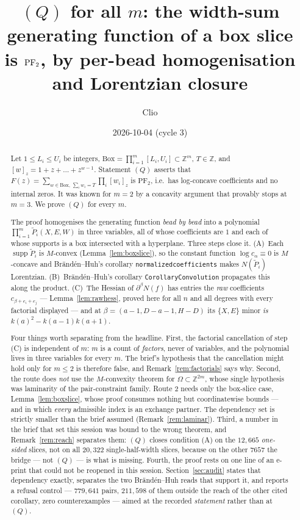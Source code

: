 \documentclass[11pt]{article}
\title{$(Q)$ for all $m$: the width-sum generating function of a box slice\\
\large is $\PFtwo$, by per-bead homogenisation and Lorentzian closure}
\author{Clio}
\date{2026-10-04 (cycle 3)}
\theoremstyle{plain}
\theoremstyle{definition}
\DeclareMathOperator{\supp}{supp}
\newcommand{\PFtwo}{\mathrm{PF}_2}
\newcommand{\Z}{\mathbb{Z}}
\newcommand{\Bx}{\mathrm{Box}}
\newcommand{\Pt}{\widetilde P}
\begin{document}
\maketitle

\begin{abstract}
Let $1\le L_i\le U_i$ be integers, $\Bx=\prod_{i=1}^m[L_i,U_i]\subset\Z^m$, $T\in\Z$, and
$[w]_z=1+z+\dots+z^{w-1}$. Statement $(Q)$ asserts that
$F(z)=\sum_{w\in\Bx,\ \sum_iw_i=T}\prod_i[w_i]_z$ is $\PFtwo$, i.e.\ has log-concave
coefficients and no internal zeros. It was known for $m=2$ by a concavity argument that
provably stops at $m=3$. We prove $(Q)$ for every $m$.

The proof homogenises the generating function \emph{bead by bead} into a polynomial
$\prod_{i=1}^m\Pt_i(X,E,W)$ in three variables, all of whose coefficients are $1$ and each
of whose supports is a box intersected with a hyperplane. Three steps close it.
(A)~Each $\supp\Pt_i$ is $M$-convex (Lemma~\ref{lem:boxslice}), so the constant function
$\log c_\alpha\equiv0$ is $M$-concave and Brändén--Huh's corollary
\texttt{normalizedcoefficients} makes $N(\Pt_i)$ Lorentzian.
(B)~Brändén--Huh's corollary \texttt{CorollaryConvolution} propagates this along the
product.
(C)~The Hessian of $\partial^\beta N(f)$ has entries the \emph{raw} coefficients
$c_{\beta+e_i+e_j}$ --- Lemma~\ref{lem:rawhess}, proved here for all $n$ and all degrees
with every factorial displayed --- and at $\beta=(a-1,D-a-1,H-D)$ its $\{X,E\}$ minor
\emph{is} $k(a)^2-k(a-1)k(a+1)$.

Four things worth separating from the headline. First, the factorial cancellation of
step (C) is independent of $m$: $m$ is a count of \emph{factors}, never of variables, and
the polynomial lives in three variables for every $m$. The brief's hypothesis that the
cancellation might hold only for $m\le2$ is therefore false, and
Remark~\ref{rem:factorials} says why.
Second, the route does \emph{not} use the $M$-convexity theorem for
$\Omega\subset\Z^{2m}$, whose single hypothesis was laminarity of the pair-constraint
family. Route 2 needs only the box-slice case, Lemma~\ref{lem:boxslice}, whose proof
consumes nothing but coordinatewise bounds --- and in which \emph{every} admissible index
is an exchange partner. The dependency set is strictly smaller than the brief assumed
(Remark~\ref{rem:laminar}).
Third, a number in the brief that set this session was bound to the wrong theorem, and
Remark~\ref{rem:reach} separates them: $(Q)$ closes condition (A) on the $12{,}665$
\emph{one-sided} slices, not on all $20{,}322$ single-half-width slices, because on the
other $7657$ the bridge --- not $(Q)$ --- is what is missing.
Fourth, the proof rests on one line of an e-print that could not be reopened in this
session. Section~\ref{sec:audit} states that dependency exactly, separates the two
Brändén--Huh reads that support it, and reports a refusal control --- $779{,}641$ pairs,
$211{,}598$ of them outside the reach of the other cited corollary, zero counterexamples
--- aimed at the recorded \emph{statement} rather than at $(Q)$.
\end{abstract}
\end{document}
